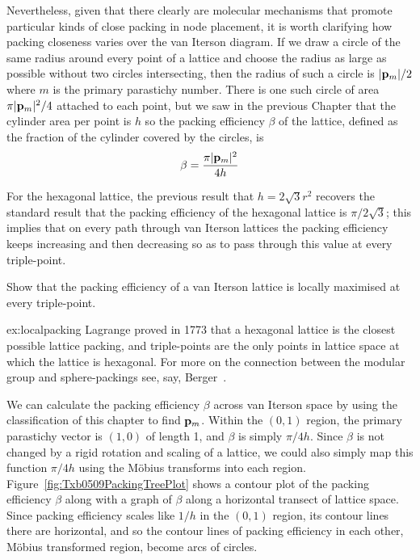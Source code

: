Nevertheless, given that there clearly are molecular mechanisms that promote particular kinds of close packing in node placement, it is worth clarifying how packing closeness varies over the van Iterson diagram.  If we  draw a circle of the same radius around every point of a lattice and choose the radius as large as possible without two circles intersecting, then the radius of such a circle is $|{\mathbf p}_{m}|/2$ where $m$ is the primary parastichy number. There is one such circle of area $ {\pi |{\mathbf p}_{m}|^2 }/{4}$ attached to each point, but we saw in the previous Chapter that the cylinder area per point is $h$ so  the packing efficiency $\beta$ of the lattice, defined as the fraction of the cylinder covered by the circles, is
\[
\beta = \frac{ \pi |{\mathbf p}_{m}|^2 }{4 h}
\]


For the hexagonal lattice, the previous result that $h= 2\sqrt{3} r^2$ 
recovers the standard result that the packing efficiency of the hexagonal lattice is $\pi/2\sqrt{3}$; this implies that on every path through van Iterson lattices the packing efficiency keeps increasing and then decreasing so as to pass through this value at every triple-point.  
\begin{jExercise}\label{ex:localpacking}
Show that the packing efficiency of a van Iterson lattice is locally maximised at every triple-point.
\end{jExercise}
\begin{jAnswer}{ex:localpacking}{
	Lagrange proved in 1773 that a hexagonal lattice is the closest possible lattice packing, and triple-points are the only points in lattice space at which the lattice is hexagonal. For more on the connection between the modular group and sphere-packings see, say, Berger~\cite{bergerGeometryRevealedJacob2010}.
}\end{jAnswer}
We can calculate the packing efficiency $\beta$ across van Iterson space by using the classification of this chapter to find ${\mathbf p}_{m}$.  Within the $(0,1)$ region, the primary parastichy vector is $(1,0)$ of length 1, and $\beta$ is simply $\pi/ {4 h }$.  Since $\beta$ is not changed by a rigid rotation and scaling of a lattice, we could also simply map this function  $\pi/ {4 h }$ using the M{\"o}bius transforms into each region. Figure~\ref{fig:Txb0509PackingTreePlot} shows a contour plot of the packing efficiency $\beta$ along with a graph of $\beta$ along a horizontal transect of lattice space.
%
Since packing efficiency scales like $1/h$ in the $(0,1)$ region, its contour lines there are horizontal, and so the contour lines of packing efficiency in each other, M{\"o}bius transformed region, become arcs of circles. 

